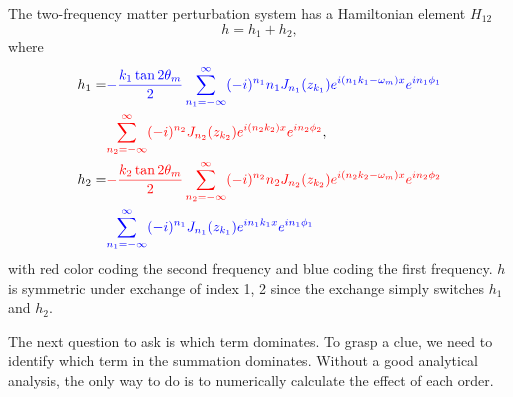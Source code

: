 The two-frequency matter perturbation system has a Hamiltonian element $H_{12}$
\begin{equation}
   h = h_1 + h_2, 
\end{equation}
where
\begin{align}
   h_1  =& {\color{blue}-\frac{k_1 \tan 2\theta_m}{2} \sum_{n_1=-\infty}^{\infty} (-i)^{n_1} n_1 J_{n_1} (z_{k_1}) e^{i (n_1 k_1-\omega_m)x} e^{i n_1\phi_1} }  \nonumber\\
   &{\color{red}\sum_{n_2=-\infty}^{\infty} (-i)^{n_2} J_{n_2}(z_{k_2}) e^{i(n_2k_2)x} e^{i n_2 \phi_2}  }, \\
   h_2 =& {\color{red} - \frac{k_2\tan 2\theta_m}{2} \sum_{n_2=-\infty}^{\infty} (-i)^{n_2} n_2 J_{n_2}(z_{k_2}) e^{i(n_2k_2-\omega_m)x} e^{i n_2 \phi_2}  } \nonumber\\
   &{\color{blue} \sum_{n_1=-\infty}^{\infty} (-i)^{n_1} J_{n_1}(z_{k_1}) e^{in_1 k_1 x} e^{i n_1 \phi_1} }
\end{align}
with red color coding the second frequency and blue coding the first frequency. $h$ is symmetric under exchange of index 1, 2 since the exchange simply switches $h_1$ and $h_2$.


The next question to ask is which term dominates. To grasp a clue, we need to identify which term in the summation dominates. Without a good analytical analysis, the only way to do is to numerically calculate the effect of each order.

